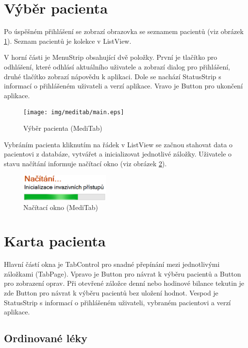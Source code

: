 \section{Výběr pacienta}

Po úspěšném přihlášení se zobrazí obrazovka se seznamem pacientů (viz obrázek \ref{fig:main}). Seznam pacientů je kolekce v ListView.

V horní části je MenuStrip obsahující dvě položky. První je tlačítko pro odhlášení, které odhlásí aktuálního uživatele a zobrazí dialog pro přihlášení, druhé tlačítko zobrazí nápovědu k aplikaci. Dole se nachází StatusStrip s informací o přihlášeném uživateli a verzí aplikace. Vravo je Button pro ukončení aplikace.

\begin{figure}[H]
	\centering
	\texttt{[image: img/meditab/main.eps]}
	\caption{Výběr pacienta (MediTab)}
  \label{fig:main}
\end{figure}


Vybráním pacienta kliknutím na řádek v ListView se začnou stahovat data o pacientovi z databáze, vytvářet a inicializovat jednotlivé záložky. Uživatele o stavu načítání informuje načítací okno (viz obrázek \ref{fig:load}).

\begin{figure}[H]
	\centering
	\includegraphics[width=0.4\textwidth]{img/meditab/loading.eps}
	\caption{Načítací okno (MediTab)}
  \label{fig:load}
\end{figure}



\section{Karta pacienta}

Hlavní částí okna je TabControl pro snadné přepínání mezi jednotlivými záložkami (TabPage). Vpravo je Button pro návrat k výběru pacientů a Button pro zobrazení oprav. Při otevřené záložce denní nebo hodinové bilance tekutin je zde Button pro návrat k výběru pacientů bez uložení hodnot. Vespod je StatusStrip s informací o přihlášeném uživateli, vybraném pacientovi a verzí aplikace.

\subsection{Ordinované léky}

